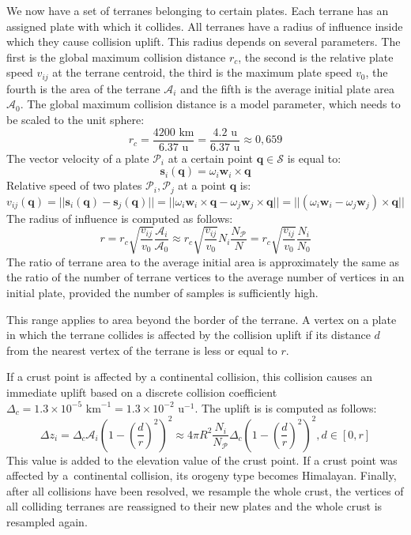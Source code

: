 We now have a set of terranes belonging to certain plates. Each terrane has an assigned plate with which it collides. All terranes have a radius of influence inside which they cause collision uplift. This radius depends on several parameters. The first is the global maximum collision distance $r_c$, the second is the relative plate speed $v_{ij}$ at the terrane centroid, the third is the maximum plate speed $v_0$, the fourth is the area of the terrane $\mathcal{A}_i$ and the fifth is the average initial plate area $\mathcal{A}_0$. The global maximum collision distance is a model parameter, which needs to be scaled to the unit sphere:
$$r_c=\frac{4200\mbox{ km}}{6.37\mbox{ u}}=\frac{4.2\mbox{ u}}{6.37\mbox{ u}}\approx 0,659$$
The vector velocity of a plate $\mathcal{P}_i$ at a certain point $\mathbf{q}\in\mathcal{S}$ is equal to:
$$\mathbf{s}_i(\mathbf{q})=\omega_i\mathbf{w}_i\times\mathbf{q}$$
Relative speed of two plates $\mathcal{P}_i,\mathcal{P}_j$ at a point $\mathbf{q}$ is:
$$v_{ij}(\mathbf{q})=||\mathbf{s}_i(\mathbf{q})-\mathbf{s}_j(\mathbf{q})||=||\omega_i\mathbf{w}_i\times\mathbf{q}-\omega_j\mathbf{w}_j\times\mathbf{q}||=||(\omega_i\mathbf{w}_i-\omega_j\mathbf{w}_j)\times\mathbf{q}||$$
The radius of influence is computed as follows:
$$r = r_c\sqrt{\frac{v_{ij}}{v_0}}\frac{\mathcal{A}_i}{\mathcal{A}_0}\approx r_c\sqrt{\frac{v_{ij}}{v_0}}N_i\frac{N_\mathcal{P}}{N}= r_c\sqrt{\frac{v_{ij}}{v_0}}\frac{N_i}{N_0}$$
The ratio of terrane area to the average initial area is approximately the same as the ratio of the number of terrane vertices to the average number of vertices in an initial plate, provided the number of samples is sufficiently high.

This range applies to area beyond the border of the terrane. A vertex on a plate in which the terrane collides is affected by the collision uplift if its distance $d$ from the nearest vertex of the terrane is less or equal to $r$.

If  a crust point is affected by a continental collision, this collision causes an immediate uplift based on a discrete collision coefficient $\Delta_c=1.3\times10^{-5}\mbox{ km}^{-1}=1.3\times10^{-2}\mbox{ u}^{-1}$. The uplift is is computed as follows:
$$\Delta z_i=\Delta_c\mathcal{A}_i\left(1-\left(\frac{d}{r}\right)^2\right)^2\approx4\pi R^2\frac{N_i}{N_\mathcal{P}}\Delta_c\left(1-\left(\frac{d}{r}\right)^2\right)^2,d\in[0,r]$$
This value is added to the elevation value of the crust point. If a crust point was affected by a~continental collision, its orogeny type becomes Himalayan. Finally, after all collisions have been resolved, we resample the whole crust, the vertices of all colliding terranes are reassigned to their new plates and the whole crust is resampled again.
